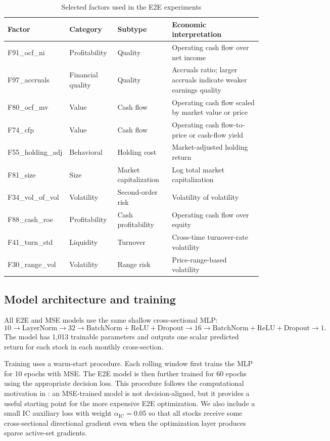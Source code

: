 \documentclass[11pt]{article}
\begin{document}
\begin{table}[H]
\centering
\caption{Selected factors used in the E2E experiments}
\label{tab:selected_factors}
\begin{tabularx}{\textwidth}{lllX}
\toprule
Factor & Category & Subtype & Economic interpretation \\
\midrule
F91\_ocf\_ni & Profitability & Quality & Operating cash flow over net income \\
F97\_accruals & Financial quality & Quality & Accruals ratio; larger accruals indicate weaker earnings quality \\
F80\_ocf\_mv & Value & Cash flow & Operating cash flow scaled by market value or price \\
F74\_cfp & Value & Cash flow & Operating cash flow-to-price or cash-flow yield \\
F55\_holding\_adj & Behavioral & Holding cost & Market-adjusted holding return \\
F81\_size & Size & Market capitalization & Log total market capitalization \\
F34\_vol\_of\_vol & Volatility & Second-order risk & Volatility of volatility \\
F88\_cash\_roe & Profitability & Cash profitability & Operating cash flow over equity \\
F41\_turn\_std & Liquidity & Turnover & Cross-time turnover-rate volatility \\
F30\_range\_vol & Volatility & Range risk & Price-range-based volatility \\
\bottomrule
\end{tabularx}
\end{table}

\subsection{Model architecture and training}

All E2E and MSE models use the same shallow cross-sectional MLP:
\[
    10 \rightarrow \mathrm{LayerNorm}
    \rightarrow 32
    \rightarrow \mathrm{BatchNorm}+\mathrm{ReLU}+\mathrm{Dropout}
    \rightarrow 16
    \rightarrow \mathrm{BatchNorm}+\mathrm{ReLU}+\mathrm{Dropout}
    \rightarrow 1.
\]
The model has 1,013 trainable parameters and outputs one scalar predicted return for each stock in each monthly cross-section.

Training uses a warm-start procedure. Each rolling window first trains the MLP for 10 epochs with MSE. The E2E model is then further trained for 60 epochs using the appropriate decision loss. This procedure follows the computational motivation in \citet{wang2026mlmm}: an MSE-trained model is not decision-aligned, but it provides a useful starting point for the more expensive E2E optimization. We also include a small IC auxiliary loss with weight $\alpha_{\mathrm{IC}}=0.05$ so that all stocks receive some cross-sectional directional gradient even when the optimization layer produces sparse active-set gradients.
\end{document}
